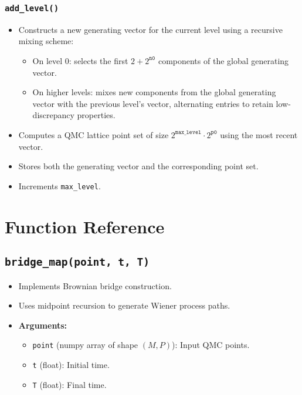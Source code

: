 \documentclass{article}
\begin{document}
\subsubsection{\texttt{add\_level()}}
\begin{itemize}
    \item Constructs a new generating vector for the current level using a recursive mixing scheme:
    \begin{itemize}
        \item On level 0: selects the first $2 + 2^{\texttt{n0}}$ components of the global generating vector.
        \item On higher levels: mixes new components from the global generating vector with the previous level’s vector, alternating entries to retain low-discrepancy properties.
    \end{itemize}
    \item Computes a QMC lattice point set of size $2^{\texttt{max\_level}} \cdot 2^{\texttt{p0}}$ using the most recent vector.
    \item Stores both the generating vector and the corresponding point set.
    \item Increments \texttt{max\_level}.
\end{itemize}

\section{Function Reference}

\subsection{\texttt{bridge\_map(point, t, T)}}
\begin{itemize}
    \item Implements Brownian bridge construction.
    \item Uses midpoint recursion to generate Wiener process paths.
    \item \textbf{Arguments:}
    \begin{itemize}
        \item \texttt{point} (numpy array of shape $(M, P)$): Input QMC points.
        \item \texttt{t} (float): Initial time.
        \item \texttt{T} (float): Final time.
    \end{itemize}
\end{itemize}
\end{document}
